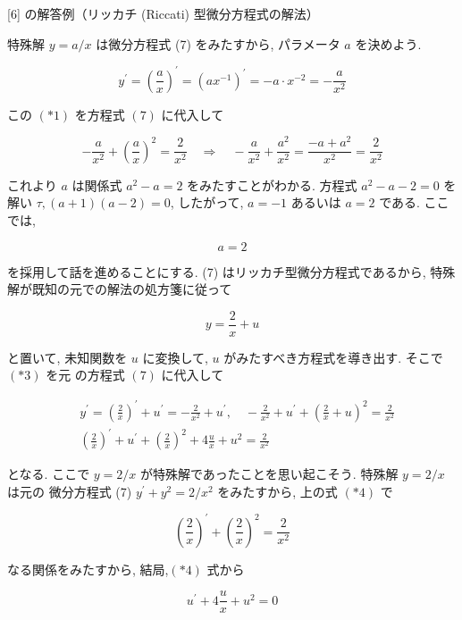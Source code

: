 \documentclass[10pt]{article}
\begin{document}
[6] の解答例（リッカチ (Riccati) 型微分方程式の解法）

特殊解 $y=a / x$ は微分方程式 (7) をみたすから, パラメータ $a$ を決めよう.


\begin{equation*}
y^{\prime}=\left(\frac{a}{x}\right)^{\prime}=\left(a x^{-1}\right)^{\prime}=-a \cdot x^{-2}=-\frac{a}{x^{2}} \tag{*1}
\end{equation*}


この $(* 1)$ を方程式 $(7)$ に代入して

$$
-\frac{a}{x^{2}}+\left(\frac{a}{x}\right)^{2}=\frac{2}{x^{2}} \quad \Longrightarrow \quad-\frac{a}{x^{2}}+\frac{a^{2}}{x^{2}}=\frac{-a+a^{2}}{x^{2}}=\frac{2}{x^{2}}
$$

これより $a$ は関係式 $a^{2}-a=2$ をみたすことがわかる. 方程式 $a^{2}-a-2=0$ を解い $\tau,(a+1)(a-2)=0$, したがって, $a=-1$ あるいは $a=2$ である. ここでは,


\begin{equation*}
a=2 \tag{*2}
\end{equation*}


を採用して話を進めることにする. (7) はリッカチ型微分方程式であるから, 特殊解が既知の元での解法の処方箋に従って


\begin{equation*}
y=\frac{2}{x}+u \tag{*3}
\end{equation*}


と置いて, 未知関数を $u$ に変換して, $u$ がみたすべき方程式を導き出す. そこで $(* 3)$ を元 の方程式 $(7)$ に代入して


\begin{align*}
& y^{\prime}=\left(\frac{2}{x}\right)^{\prime}+u^{\prime}=-\frac{2}{x^{2}}+u^{\prime}, \quad-\frac{2}{x^{2}}+u^{\prime}+\left(\frac{2}{x}+u\right)^{2}=\frac{2}{x^{2}} \\
& \left(\frac{2}{x}\right)^{\prime}+u^{\prime}+\left(\frac{2}{x}\right)^{2}+4 \frac{u}{x}+u^{2}=\frac{2}{x^{2}} \tag{*4}
\end{align*}


となる. ここで $y=2 / x$ が特殊解であったことを思い起こそう. 特殊解 $y=2 / x$ は元の 微分方程式 (7) $y^{\prime}+y^{2}=2 / x^{2}$ をみたすから, 上の式 $(* 4)$ で

$$
\left(\frac{2}{x}\right)^{\prime}+\left(\frac{2}{x}\right)^{2}=\frac{2}{x^{2}}
$$

なる関係をみたすから, 結局,$(* 4)$ 式から


\begin{equation*}
u^{\prime}+4 \frac{u}{x}+u^{2}=0 \tag{*5}
\end{equation*}
\end{document}
